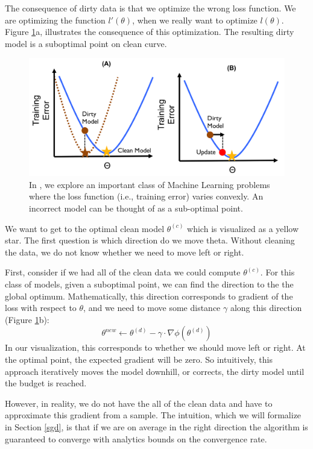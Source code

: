 The consequence of dirty data is that we optimize the wrong loss function.
We are optimizing the function $l'(\theta)$, when we really want to optimize $l(\theta)$.
Figure \ref{update-arch2}a, illustrates the consequence of this optimization.
The resulting dirty model is a suboptimal point on clean curve.

\begin{figure}[ht!]
\centering
 \includegraphics[width=\columnwidth]{figs/update-arch2.png}
 \caption{In \sys, we explore an important class of Machine Learning problems where the loss function (i.e., training error) varies convexly. An incorrect model can be thought of as a sub-optimal point. \label{update-arch2}}
\end{figure}

We want to get to the optimal clean model $\theta^{(c)}$ which is visualized as a yellow star.
The first question is which direction do we move theta.
Without cleaning the data, we do not know whether we need to move left or right.

First, consider if we had all of the clean data we could compute $\theta^{(c)}$.
For this class of models, given a suboptimal point, we can find the direction to the 
the global optimum.
Mathematically, this direction corresponds to gradient of the loss with respect to $\theta$, and we need to move some distance $\gamma$ along this direction (Figure \ref{update-arch2}b):
\[
\theta^{new} \leftarrow \theta^{(d)} - \gamma \cdot \nabla\phi(\theta^{(d)})
\]
In our visualization, this corresponds to whether we should move left or right.
At the optimal point, the expected gradient will be zero.
So intuitively, this approach iteratively moves the model downhill, or corrects, the dirty model until the budget is reached.

However, in reality, we do not have the all of the clean data and have to approximate this gradient from a sample.
The intuition, which we will formalize in Section \ref{sgd}, is that if we are on average in the right direction the algorithm is guaranteed to converge with analytics bounds on the convergence rate.

